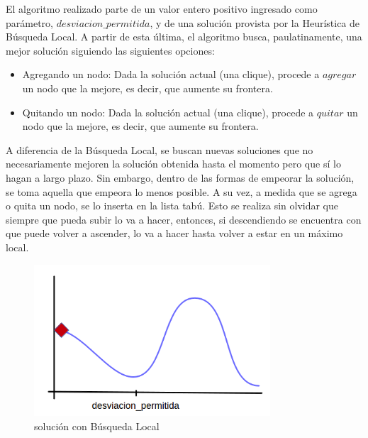  El algoritmo realizado parte de un valor entero positivo ingresado como parámetro, $desviacion\_permitida$, y de una solución provista por la Heurística de Búsqueda Local. A partir de esta última, el algoritmo busca, paulatinamente, una mejor solución siguiendo las siguientes opciones:
\begin{itemize}
 \item Agregando un nodo: Dada la solución actual (una clique), procede a $agregar$ un nodo que la mejore, es decir, que aumente su frontera.
 \item Quitando un nodo: Dada la solución actual (una clique), procede a $quitar$ un nodo que la mejore, es decir, que aumente su frontera.
\end{itemize}
A diferencia de la Búsqueda Local, se buscan nuevas soluciones que no necesariamente mejoren la solución obtenida hasta el momento pero que sí lo hagan a largo plazo. Sin embargo, dentro de las formas de empeorar la solución, se toma aquella que empeora lo menos posible. A su vez, a medida que se agrega o quita un nodo, se lo inserta en la lista tabú. Esto se realiza sin olvidar que siempre que pueda subir lo va a hacer, entonces, si descendiendo se encuentra con que puede volver a ascender, lo va a hacer hasta volver a estar en un máximo local.\newline

\begin{figure}[H] %
\begin{center}
\includegraphics[width=250pt]{../imgs/1_tabu.png}
\caption{solución con Búsqueda Local}
\end{center}
\end{figure}


